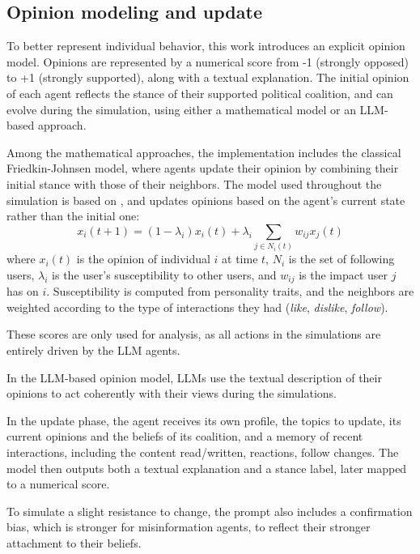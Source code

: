 \subsection{Opinion modeling and update}
To better represent individual behavior, this work introduces an explicit opinion model.
Opinions are represented by a numerical score from -1 (strongly opposed) to +1 (strongly supported), along with a textual explanation. 
The initial opinion of each agent reflects the stance of their supported political coalition, and can evolve during the simulation, using either a mathematical model or an LLM-based approach.

\medskip
Among the mathematical approaches, the implementation includes the classical Friedkin-Johnsen model, where agents update their opinion by combining their initial stance with those of their neighbors.
The model used throughout the simulation is based on \cite{Ye2018Opinion}, and updates opinions based on the agent's current state rather than the initial one:
\[
x_i(t + 1) = (1 - \lambda_i) x_i(t) + \lambda_i  \sum_{j \in N_i(t)} w_{ij} x_j (t)
\]
where $x_i(t)$ is the opinion of individual $i$ at time $t$, $N_i$ is the set of following users, $\lambda_i$ is the user's susceptibility to other users, and $w_{ij}$ is the impact user $j$ has on $i$. 
Susceptibility is computed from personality traits, and the neighbors are weighted according to the type of interactions they had (\textit{like}, \textit{dislike}, \textit{follow}). 

These scores are only used for analysis, as all actions in the simulations are entirely driven by the LLM agents.


\medskip
In the LLM-based opinion model, LLMs use the textual description of their opinions to act coherently with their views during the simulations.

In the update phase, the agent receives its own profile, the topics to update, its current opinions and the beliefs of its coalition, and a memory of recent interactions, including the content read/written, reactions, follow changes.
The model then outputs both a textual explanation and a stance label, later mapped to a numerical score.

To simulate a slight resistance to change, the prompt also includes a confirmation bias, which is stronger for misinformation agents, to reflect their stronger attachment to their beliefs.

